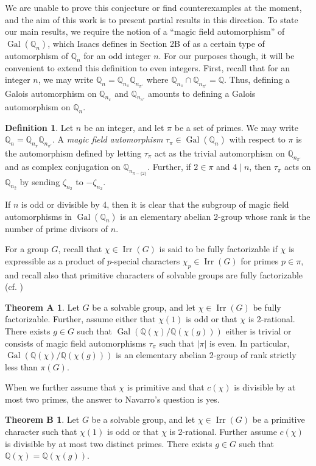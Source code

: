 \documentclass[12pt]{amsart}
\theoremstyle{definition}
\newtheorem{definition}[theorem]{Definition}
\newtheorem*{thmA}{Theorem A}
\newtheorem*{thmB}{Theorem B}
\newcommand{\Q}{\mathbb{Q}}
\DeclareMathOperator{\Gal}{Gal}
\DeclareMathOperator{\Irr}{Irr}
\begin{document}
We are unable to prove this conjecture or find counterexamples at the moment, and the aim of this work is to present partial results in this direction.  To state our main results, we  require the notion of a ``magic field automorphism'' of $\Gal(\Q_n)$, which Isaacs defines in Section 2B of \cite{Is2} as a certain type of automorphism of $\Q_n$ for an odd integer $n$. For our purposes though, it will be  convenient to extend this definition to even integers. First, recall that for an integer $n$, we may write $\Q_n = \Q_{n_\pi}\Q_{n_{\pi'}}$ where $\Q_{n_\pi} \cap \Q_{n_{\pi'}} = \Q$. Thus, defining a Galois automorphism on $\Q_{n_\pi}$ and $\Q_{n_{\pi'}}$ amounts to defining a Galois automorphism on $\Q_n$.
\begin{definition}
	Let $n$ be an integer, and let $\pi$ be a set of primes. We may write $\Q_n = \Q_{n_\pi}\Q_{n_{\pi'}}$. A \emph{magic field automorphism} $\tau_\pi \in \Gal(\Q_n)$ with respect to $\pi$ is the automorphism defined by letting $\tau_\pi$ act as the trivial automorphism on $\Q_{n_{\pi'}}$ and as complex conjugation on $\Q_{n_{\pi - \{2\}}}$. Further, if $2 \in \pi$ and $4 \mid n$, then $\tau_\pi$ acts on $\Q_{n_2}$ by sending $\zeta_{n_2}$ to $-\zeta_{n_2}$. 
\end{definition} 

If $n$ is odd or divisible by 4, then it is clear that the subgroup of magic field automorphisms in $\Gal(\Q_n)$ is an elementary abelian 2-group whose rank is the number of prime divisors of $n$.

For a group $G$, recall that $\chi \in \Irr(G)$ is said to be fully factorizable if $\chi$ is expressible as a product of $p$-special characters $\chi_p \in \Irr(G)$ for primes $p \in \pi$, and recall also that primitive characters of solvable groups are fully factorizable (cf. \cite[Theorem 2.9]{Is2})

\begin{thmA}
	Let $G$ be a solvable group, and let $\chi \in \Irr(G)$ be fully factorizable. Further, assume either  that $\chi(1)$ is odd or that $\chi$ is 2-rational. There exists $g \in G$ such that $\Gal(\Q(\chi)/\Q(\chi(g)))$ either is trivial or consists of magic field automorphisms $\tau_\pi$ such that $|\pi|$ is even. In particular, $\Gal(\Q(\chi)/\Q(\chi(g)))$ is an elementary abelian 2-group of rank strictly less than $\pi(G)$.
\end{thmA}
When we further assume that $\chi$ is primitive and that $c(\chi)$ is divisible by at most two primes, the answer to Navarro's question is yes.
\begin{thmB}
	Let $G$ be a solvable group, and let $\chi \in \Irr(G)$ be a primitive character such that $\chi(1)$ is odd or that $\chi$ is 2-rational. Further assume $c(\chi)$ is divisible by at most two distinct primes. There exists $g \in G$ such that $\Q(\chi) = \Q(\chi(g))$.
\end{thmB}
\end{document}
